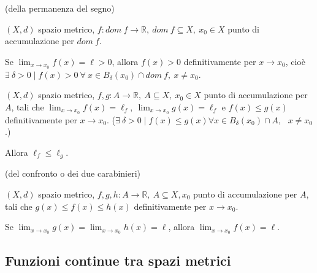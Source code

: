 \begin{theorem} (della permanenza del segno)
	
	$(X,d)$ spazio metrico, $f: dom \ f \rightarrow \mathbb{R}, \ dom \ f \subseteq X, \ x_0 \in X$ punto di accumulazione per $dom \ f$.
	
	Se $\lim_{x \rightarrow x_0} f(x) = \ell > 0$, allora $f(x) > 0$ definitivamente per $ x \rightarrow x_0$, cioè $\exists \ \delta > 0 \; \big| \; f(x) > 0 \ \forall \ x \in B_\delta (x_0) \cap dom \ f, \ x \neq x_0$. 
\end{theorem}


\begin{theorem}
	$(X,d)$ spazio metrico, $f,g: A \rightarrow \mathbb{R}, \ A \subseteq X, \ x_0 \in X$ punto di accumulazione per $A$, tali che $\lim_{x \rightarrow x_0} f(x) = \ell_f, \ \lim_{x \rightarrow x_0} g(x) = \ell_f$ e $f(x) \leq g(x)$ definitivamente per $x \rightarrow x_0$. ($\exists \ \delta > 0 \; \big| \; f(x) \leq g(x) \forall x \in B_\delta (x_0) \cap A$, \ $x \neq x_0$.)
	
	Allora $\ell_f \leq \ell_g$.
\end{theorem}


\begin{theorem}(del confronto o dei due carabinieri)
	
	$(X,d)$ spazio metrico, $f,g,h : A \rightarrow \mathbb{R}, \ A \subseteq X, x_0$ punto di accumulazione per $A$, tali che $g(x) \leq f(x) \leq h(x)$ definitivamente per $x \rightarrow x_0$. 
	
	Se $\lim_{x \rightarrow x_0} g(x) = \lim_{x \rightarrow x_0} h(x) = \ell$, allora $\lim_{x \rightarrow x_0} f(x) = \ell$.
\end{theorem}


\subsection{Funzioni continue tra spazi metrici}

